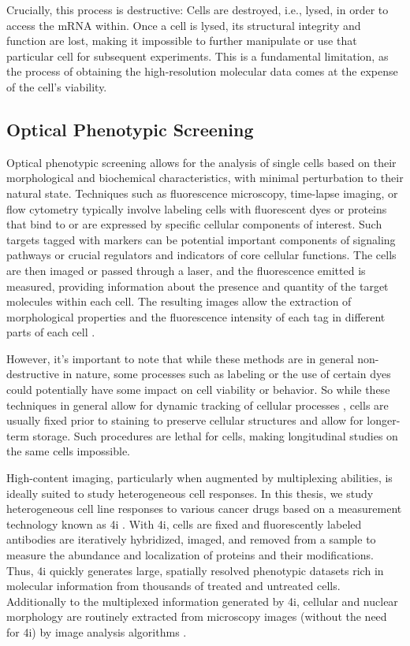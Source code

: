 Crucially, this process is destructive: Cells are destroyed, i.e., lysed, in order to access the mRNA within.
Once a cell is lysed, its structural integrity and function are lost, making it impossible to further manipulate or use that particular cell for subsequent experiments.
This is a fundamental limitation, as the process of obtaining the high-resolution molecular data comes at the expense of the cell's viability.

\subsection{Optical Phenotypic Screening}
\label{sec:background_imaging}

Optical phenotypic screening allows for the analysis of single cells based on their morphological and biochemical characteristics, with minimal perturbation to their natural state. 
Techniques such as fluorescence microscopy, time-lapse imaging, or flow cytometry typically involve labeling cells with fluorescent dyes or proteins that bind to or are expressed by specific cellular components of interest.
Such targets tagged with markers can be potential important components of signaling pathways or crucial regulators and indicators of core cellular functions. 
The cells are then imaged or passed through a laser, and the fluorescence emitted is measured, providing information about the presence and quantity of the target molecules within each cell. 
The resulting images allow the extraction of morphological properties and the fluorescence intensity of each tag in different parts of each cell \citep{carpenter2006cellprofiler}.

However, it's important to note that while these methods are in general non-destructive in nature, some processes such as labeling or the use of certain dyes could potentially have some impact on cell viability or behavior. So while these techniques in general allow for dynamic tracking of cellular processes \citep{fischer2019inferring, hashimoto2016learning, tvarusko1999time, busch2015fundamental}, cells are usually fixed prior to staining to preserve cellular structures and allow for longer-term storage. Such procedures are lethal for cells, making longitudinal studies on the same cells impossible.

High-content imaging, particularly when augmented by multiplexing abilities, is ideally suited to study heterogeneous cell responses.
In this thesis, we study heterogeneous cell line responses to various cancer drugs based on a measurement technology known as \acrfull{4i} \citep{gut2018multiplexed}.
With 4i, cells are fixed and fluorescently labeled antibodies are iteratively hybridized, imaged, and removed from a sample to measure the abundance and localization of proteins and their modifications. 
Thus, 4i quickly generates large, spatially resolved phenotypic datasets rich in molecular information from thousands of treated and untreated cells. Additionally to the multiplexed information generated by 4i, cellular and nuclear morphology are routinely extracted from microscopy images (without the need for 4i) by image analysis algorithms \citep{carpenter2006cellprofiler}.

